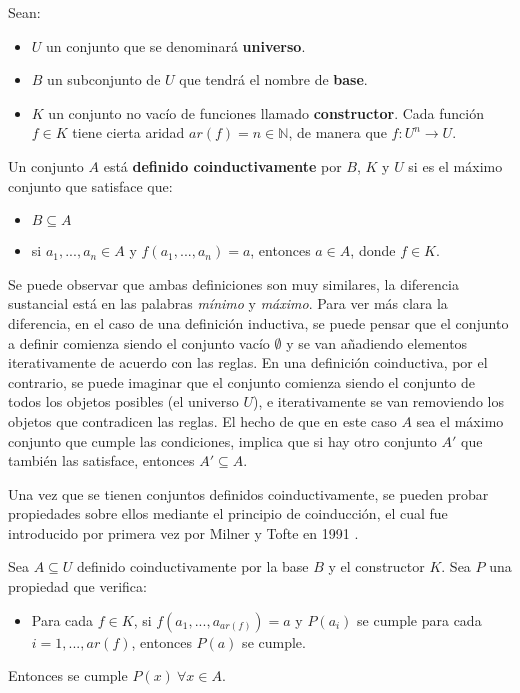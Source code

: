 \begin{definition}
Sean:
\begin{itemize}
\item $U$ un conjunto que se denominará \textbf{universo}.
\item $B$ un subconjunto  de $U$ que tendrá el nombre de \textbf{base}. 
\item $K$ un conjunto no vacío de funciones llamado \textbf{constructor}. Cada función $f \in K$ tiene cierta aridad $ar(f) = n \in \mathbb{N}$, de manera que $f : U^n \rightarrow U$.
\end{itemize}
Un conjunto $A$ está \textbf{definido coinductivamente} por $B$, $K$ y $U$ si es el máximo conjunto que satisface que:
\begin{itemize}
\item $B \subseteq A$
\item si $a_1, ..., a_n \in A$ y $f(a_1, ..., a_n) = a$, entonces $a \in A$, donde $f \in K$. 
\end{itemize}
\end{definition}

Se puede observar que ambas definiciones son muy similares, la diferencia sustancial está en las palabras \textit{mínimo} y \textit{máximo}. Para ver más clara la diferencia, en el caso de una definición inductiva, se puede pensar que el conjunto a definir comienza siendo el conjunto vacío $\emptyset$ y se van añadiendo elementos iterativamente de acuerdo con las reglas. En una definición coinductiva, por el contrario, se puede imaginar que el conjunto comienza siendo el conjunto de todos los objetos posibles (el universo $U$), e iterativamente se van removiendo los objetos que contradicen las reglas. El hecho de que en este caso $A$ sea el máximo conjunto que cumple las condiciones, implica que si hay otro conjunto $A'$ que también las satisface, entonces $A' \subseteq A$.

Una vez que se tienen conjuntos definidos coinductivamente, se pueden probar propiedades sobre ellos mediante el principio de coinducción, el cual fue introducido por primera vez por Milner y Tofte en 1991 \cite{milner:1991}.

\begin{thm}
Sea $A \subseteq U$ definido coinductivamente por la base $B$ y el constructor $K$. Sea $P$ una propiedad que verifica:
\begin{itemize}
\item Para cada $f \in K$, si $f(a_1, ..., a_{ar(f)}) = a$ y $P(a_i)$ se cumple para cada $i = 1, ..., ar(f)$, entonces $P(a)$ se cumple. 
\end{itemize}
Entonces se cumple $P(x) \ \forall x \in A$.
\end{thm}

